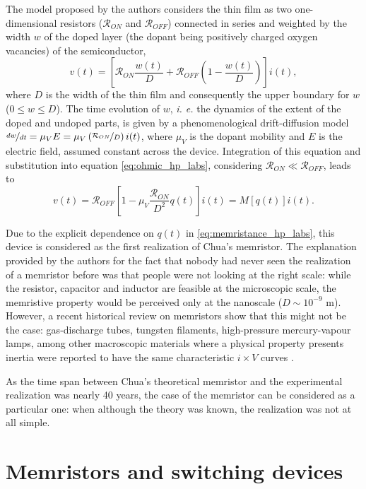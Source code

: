 The model proposed by the authors considers the thin film as two one-dimensional resistors ($\mathcal{R}_{ON}$ and $\mathcal{R}_{OFF}$) connected in series and weighted by the width $w$ of the doped layer (the dopant being positively charged oxygen vacancies) of the semiconductor,
\begin{equation}
 v(t)=\left[\mathcal{R}_{ON}\frac{w(t)}{D}+\mathcal{R}_{OFF}\left(1-\frac{w(t)}{D}\right)\right]i(t),
 \label{eq:ohmic_hp_labs}
\end{equation}
where $D$ is the width of the thin film and consequently the upper boundary for $w$ ($0 \leq w \leq D$). The time evolution of $w$, {\em i. e.} the dynamics of the extent of the doped and undoped parts, is given by a phenomenological drift-diffusion model $\nicefrac{dw}{dt}= \mu_V E = \mu_V\left(\nicefrac{\mathcal{R}_{ON}}{D}\right)i(t)$, where $\mu_V$ is the dopant mobility and $E$ is the electric field, assumed constant across the device. Integration of this equation and substitution into equation \ref{eq:ohmic_hp_labs}, considering \(\mathcal{R}_{ON} \ll \mathcal{R}_{OFF}\), leads to
\begin{equation}
  v(t) = \mathcal{R}_{OFF}\left[1-\mu_V\frac{\mathcal{R}_{ON}}{D^2}q(t)\right]i(t)=M[q(t)]i(t).
  \label{eq:memristance_hp_labs}
\end{equation}

Due to the explicit dependence on $q(t)$ in \ref{eq:memristance_hp_labs}, this device is considered as the first realization of Chua's memristor. The explanation provided by the authors for the fact that nobody had never seen the realization of a memristor before was that people were not looking at the right scale: while the resistor, capacitor and inductor are feasible at the microscopic scale, the memristive property would be perceived only at the nanoscale ($D \sim 10^{-9}$ m). However, a recent historical review on memristors show that this might not be the case: gas-discharge tubes, tungsten filaments, high-pressure mercury-vapour lamps, among other macroscopic materials where a physical property presents inertia were reported to have the same characteristic $i \times V$ curves \cite{Prodromakis2012}.

As the time span between Chua's theoretical memristor and the experimental realization was nearly 40 years, the case of the memristor can be considered as a particular one: when although the theory was known, the realization was not at all simple.
\newpage

\section{Memristors and switching devices}

